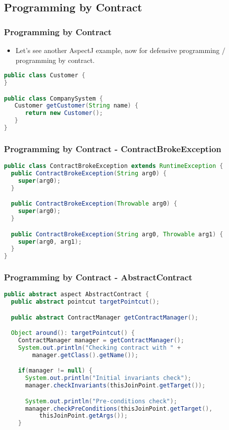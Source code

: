 \documentclass[11pt]{beamer}
\begin{document}
\subsection*{Programming by Contract}

\begin{frame}[fragile]
   \frametitle{Programming by Contract}
   \begin{itemize}
      \item Let's see another AspectJ example, now for defensive programming / programming by contract.
   \end{itemize}
   {\scriptsize
   \begin{lstlisting}[language=java]
public class Customer {
}

public class CompanySystem {
   Customer getCustomer(String name) {
      return new Customer();
   }
}
   \end{lstlisting}}
   
\end{frame}

\begin{frame}[fragile]
   \frametitle{Programming by Contract - ContractBrokeException}
{\scriptsize
\begin{lstlisting}[language=java]
public class ContractBrokeException extends RuntimeException {
  public ContractBrokeException(String arg0) {
    super(arg0);
  }

  public ContractBrokeException(Throwable arg0) {
    super(arg0);
  }

  public ContractBrokeException(String arg0, Throwable arg1) {
    super(arg0, arg1);
  }
}
\end{lstlisting}}
\end{frame}

\begin{frame}[fragile]
   \frametitle{Programming by Contract - AbstractContract}
{\scriptsize
\begin{lstlisting}[language=java]
public abstract aspect AbstractContract {
  public abstract pointcut targetPointcut();

  public abstract ContractManager getContractManager();

  Object around(): targetPointcut() {
    ContractManager manager = getContractManager();
    System.out.println("Checking contract with " +
        manager.getClass().getName());

    if(manager != null) {
      System.out.println("Initial invariants check");
      manager.checkInvariants(thisJoinPoint.getTarget());

      System.out.println("Pre-conditions check");
      manager.checkPreConditions(thisJoinPoint.getTarget(),
          thisJoinPoint.getArgs());
    }
\end{lstlisting}}
\end{frame}
\end{document}
